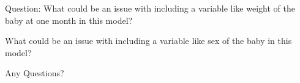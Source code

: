 \documentclass[10pt,t]{beamer}
\begin{document}

\begin{frame}
	Question: What could be an issue with including a variable like weight of the baby at one month in this model?
	\bigskip
	
	 What could be an issue with including a variable like sex of the baby in this model?
	
\end{frame}

\begin{frame}[c]
\centering \huge Any Questions?
\end{frame}
\end{document}
